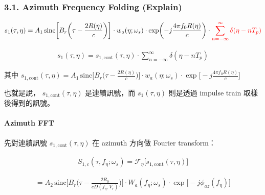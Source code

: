 \documentclass[11pt]{article}
\begin{document}
\hypertarget{azimuth-frequency-folding-explain}{%
\subsubsection{3.1. Azimuth Frequency Folding
(Explain)}\label{azimuth-frequency-folding-explain}}

\begin{equation}
\begin{aligned}
s_1(\tau,\eta) = A_1\,
\mathrm{sinc}\biggl[ B_r\biggl( \tau-\frac{2R(\eta)}{c} \biggr) \biggr]\cdot w_a(\eta;\omega_s)\cdot
\exp\biggl( -j\frac{4\pi f_0R(\eta)}{c} \biggr)\cdot
{\color{red}{\sum_{n=-\infty}^{\infty}\delta(\eta-nT_p)}}
\end{aligned}
\end{equation}

\begin{equation}
\begin{aligned} s_1(\tau,\eta) = s_{1,\mathrm{cont}}(\tau,\eta)\cdot \sum_{n=-\infty}^{\infty}\delta(\eta-nT_p) \end{aligned}
\end{equation}

其中 \(s_{1,\mathrm{cont}}(\tau,\eta) = A_1\, \mathrm{sinc}\biggl[ B_r\biggl( \tau-\frac{2R(\eta)}{c} \biggr) \biggr]\cdot w_a(\eta;\omega_s)\cdot \exp\biggl[ -j\frac{4\pi f_0R(\eta)}{c} \biggr]\)

也就是說， \(s_{1,\mathrm{cont}}(\tau,\eta)\) 是連續訊號，而 \(s_1(\tau,\eta)\) 則是透過 impulse train 取樣後得到的訊號。

\hypertarget{azimuth-fft}{%
\paragraph{Azimuth FFT}\label{azimuth-fft}}

先對連續訊號 \(s_{1,\mathrm{cont}}(\tau,\eta)\) 在 azimuth 方向做
Fourier transform：

\begin{equation}
\begin{aligned} S_{1,c}(\tau,f_\eta;\omega_s) = \mathcal{F}_{\eta}\biggl[ s_{1,\mathrm{cont}}(\tau,\eta) \biggr] \end{aligned}
\end{equation}

\begin{equation}
\begin{aligned}
= A_2\,
\mathrm{sinc}\biggl[ B_r\biggl( \tau-\frac{2R_0}{cD(f_\eta,V_r)} \biggr) \biggr]\cdot W_a(f_\eta;\omega_s)\cdot
\exp\biggl[-j\phi_{az}(f_\eta)\biggr]
\end{aligned}
\end{equation}
\end{document}
